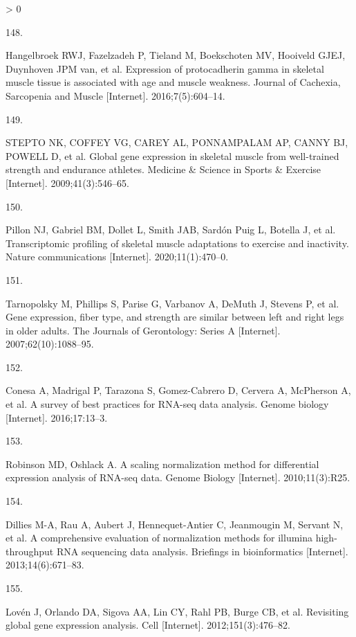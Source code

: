 \documentclass[twoside,10pt]{gihclass} %
\newlength{\cslhangindent}
\newlength{\csllabelwidth}
\newenvironment{CSLReferences}[3] %
 {%
  \setlength{\parindent}{0pt}
  \ifodd #1 \everypar{\setlength{\hangindent}{\cslhangindent}}\ignorespaces\fi
  \ifnum #2 > 0
  \setlength{\parskip}{#2\baselineskip}
  \fi
 }%
 {}
\newcommand{\CSLLeftMargin}[1]{\parbox[t]{\maxof{\widthof{#1}}{\csllabelwidth}}{#1}}
\newcommand{\CSLRightInline}[1]{\parbox[t]{\linewidth}{#1}}
\begin{document}
\begin{CSLReferences}{0}{0}
\leavevmode\hypertarget{ref-RN2402}{}%
\CSLLeftMargin{148. }
\CSLRightInline{Hangelbroek RWJ, Fazelzadeh P, Tieland M, Boekschoten MV, Hooiveld GJEJ, Duynhoven JPM van, et al. Expression of protocadherin gamma in skeletal muscle tissue is associated with age and muscle weakness. Journal of Cachexia, Sarcopenia and Muscle {[}Internet{]}. 2016;7(5):604--14. }

\leavevmode\hypertarget{ref-RN2398}{}%
\CSLLeftMargin{149. }
\CSLRightInline{STEPTO NK, COFFEY VG, CAREY AL, PONNAMPALAM AP, CANNY BJ, POWELL D, et al. Global gene expression in skeletal muscle from well-trained strength and endurance athletes. Medicine \& Science in Sports \& Exercise {[}Internet{]}. 2009;41(3):546--65. }

\leavevmode\hypertarget{ref-RN2360}{}%
\CSLLeftMargin{150. }
\CSLRightInline{Pillon NJ, Gabriel BM, Dollet L, Smith JAB, Sardón Puig L, Botella J, et al. Transcriptomic profiling of skeletal muscle adaptations to exercise and inactivity. Nature communications {[}Internet{]}. 2020;11(1):470--0. }

\leavevmode\hypertarget{ref-RN2403}{}%
\CSLLeftMargin{151. }
\CSLRightInline{Tarnopolsky M, Phillips S, Parise G, Varbanov A, DeMuth J, Stevens P, et al. Gene expression, fiber type, and strength are similar between left and right legs in older adults. The Journals of Gerontology: Series A {[}Internet{]}. 2007;62(10):1088--95. }

\leavevmode\hypertarget{ref-RN2426}{}%
\CSLLeftMargin{152. }
\CSLRightInline{Conesa A, Madrigal P, Tarazona S, Gomez-Cabrero D, Cervera A, McPherson A, et al. A survey of best practices for RNA-seq data analysis. Genome biology {[}Internet{]}. 2016;17:13--3. }

\leavevmode\hypertarget{ref-RN2414}{}%
\CSLLeftMargin{153. }
\CSLRightInline{Robinson MD, Oshlack A. A scaling normalization method for differential expression analysis of RNA-seq data. Genome Biology {[}Internet{]}. 2010;11(3):R25. }

\leavevmode\hypertarget{ref-RN2363}{}%
\CSLLeftMargin{154. }
\CSLRightInline{Dillies M-A, Rau A, Aubert J, Hennequet-Antier C, Jeanmougin M, Servant N, et al. A comprehensive evaluation of normalization methods for illumina high-throughput RNA sequencing data analysis. Briefings in bioinformatics {[}Internet{]}. 2013;14(6):671--83. }

\leavevmode\hypertarget{ref-RN2359}{}%
\CSLLeftMargin{155. }
\CSLRightInline{Lovén J, Orlando DA, Sigova AA, Lin CY, Rahl PB, Burge CB, et al. Revisiting global gene expression analysis. Cell {[}Internet{]}. 2012;151(3):476--82. }


\end{CSLReferences}
\end{document}
